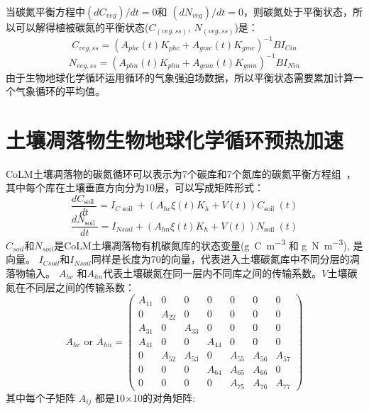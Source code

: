 当碳氮平衡方程中$(dC_{veg})/dt=0$和 $(dN_{veg})/dt=0$，则碳氮处于平衡状态，所以可以解得植被碳氮的平衡状态($C_{(veg,ss)}$, $N_{(veg,ss)}$)是：
\begin{equation}
C_{veg, s s}=\left(A_{p h c}(t) K_{p h c}+A_{gmc}(t) K_{gmc}\right)^{-1} B I_{{Cin }}
\end{equation}
\begin{equation}
N_{veg, s s}=\left(A_{phn}(t) K_{phn}+A_{gmn}(t) K_{gmn}\right)^{-1} B I_{Nin}
\end{equation}
由于生物地球化学循环运用循环的气象强迫场数据，所以平衡状态需要累加计算一个气象循环的平均值。


\section{土壤凋落物生物地球化学循环预热加速}
CoLM土壤凋落物的碳氮循环可以表示为7个碳库和7个氮库的碳氮平衡方程组~\citep{lu2020full}，其中每个库在土壤垂直方向分为10层，可以写成矩阵形式：
\begin{equation}
\frac{d C_{\text {soil }}}{dt}=I_{C \text { soil }}+\left(A_{h c} \xi(t) K_{h}+V(t)\right) C_{\text {soil }}(t)
\end{equation}
\begin{equation}
\frac{d N_{\text {soil }}}{dt}=I_{N s o i l}+\left(A_{h n} \xi(t) K_{h}+V(t)\right) N_{\text {soil }}(t)
\end{equation}
$C_{soil}$和$N_{soil}$是CoLM土壤凋落物有机碳氮库的状态变量(\unit{g.C.m^{-3}} 和 \unit{g.N.m^{-3}}), 是向量。
$I_{Csoil}$和$I_{Nsoil}$同样是长度为70的向量，代表进入土壤碳氮库中不同分层的凋落物输入。
 $A_{hc}$ 和$A_{hn}$代表土壤碳氮在同一层内不同库之间的传输系数。$V$土壤碳氮在不同层之间的传输系数：
\begin{equation}
A_{h c} \text { or } A_{h n}=\left(\begin{array}{ccccccc}
  A_{11} & 0 & 0 & 0 & 0 & 0 & 0 \\ 
  0 & A_{22} & 0 & 0 & 0 & 0 & 0 \\
  A_{31} & 0 & A_{33} & 0 & 0 & 0 & 0 \\
  A_{41} & 0 & 0 & A_{44} & 0 & 0 & 0 \\
  0 & A_{52} & A_{53} & 0 & A_{55} & A_{56} & A_{57} \\
  0 & 0 & 0 & A_{64} & A_{65} & A_{66} & 0 \\ 
  0 & 0 & 0 & 0 & A_{75} & A_{76} & A_{77}\end{array}\right)
\end{equation}
其中每个子矩阵 $A_{ij}$ 都是10$\times$10的对角矩阵:  

